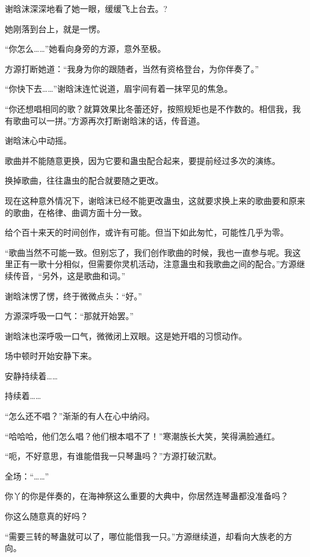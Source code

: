 
\begin{this_body}

谢晗沫深深地看了她一眼，缓缓飞上台去。?

她刚落到台上，就是一愣。

“你怎么……”她看向身旁的方源，意外至极。

方源打断她道：“我身为你的跟随者，当然有资格登台，为你伴奏了。”

“你快下去……”谢晗沫连忙说道，眉宇间有着一抹罕见的焦急。

“你还想唱相同的歌？就算效果比冬蕾还好，按照规矩也是不作数的。相信我，我有歌曲可以一拼。”方源再次打断谢晗沫的话，传音道。

谢晗沫心中动摇。

歌曲并不能随意更换，因为它要和蛊虫配合起来，要提前经过多次的演练。

换掉歌曲，往往蛊虫的配合就要随之更改。

现在这种意外情况下，谢晗沫已经不能更改蛊虫，这就要求换上来的歌曲要和原来的歌曲，在格律、曲调方面十分一致。

给个百十来天的时间创作，或许有可能。但当下如此匆忙，可能性几乎为零。

“歌曲当然不可能一致。但别忘了，我们创作歌曲的时候，我也一直参与呢。我这里正有一歌十分相似，但需要你灵机活动，注意蛊虫和我歌曲之间的配合。”方源继续传音，“另外，这是歌曲和词。”

谢晗沫愣了愣，终于微微点头：“好。”

方源深呼吸一口气：“那就开始罢。”

谢晗沫也深呼吸一口气，微微闭上双眼。这是她开唱的习惯动作。

场中顿时开始安静下来。

安静持续着……

持续着……

“怎么还不唱？”渐渐的有人在心中纳闷。

“哈哈哈，他们怎么唱？他们根本唱不了！”寒潮族长大笑，笑得满脸通红。

“呃，不好意思，有谁能借我一只琴蛊吗？”方源打破沉默。

全场：“……”

你丫的你是伴奏的，在海神祭这么重要的大典中，你居然连琴蛊都没准备吗？

你这么随意真的好吗？

“需要三转的琴蛊就可以了，哪位能借我一只。”方源继续道，却看向大族老的方向。


\end{this_body}

